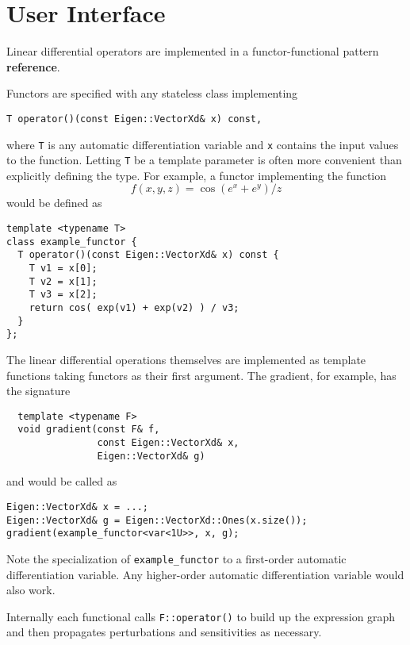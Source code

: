 \section{User Interface} \label{sec:user_interface}

Linear differential operators are implemented in a functor-functional
pattern \textbf{reference}.

Functors are specified with any stateless class implementing
%
\begin{verbatim}
T operator()(const Eigen::VectorXd& x) const,
\end{verbatim}
%
where \verb|T| is any automatic differentiation variable and \verb|x|
contains the input values to the function.  Letting \verb|T| be
a template parameter is often more convenient than explicitly
defining the type.  For example, a functor implementing the function
%
\begin{equation*}
f \! \left( x, y, z \right) = \cos \! \left( e^{x} + e^{y} \right) / z
\end{equation*}
%
would be defined as
%
\begin{verbatim}
template <typename T>
class example_functor {
  T operator()(const Eigen::VectorXd& x) const {
    T v1 = x[0];
    T v2 = x[1];
    T v3 = x[2];
    return cos( exp(v1) + exp(v2) ) / v3;  
  }
};
\end{verbatim}

The linear differential operations themselves are implemented as
template functions taking functors as their first argument.  The 
gradient, for example, has the signature
%
\begin{verbatim}
  template <typename F>
  void gradient(const F& f,
                const Eigen::VectorXd& x,
                Eigen::VectorXd& g)
\end{verbatim}
%
and would be called as
%
\begin{verbatim}
Eigen::VectorXd& x = ...;
Eigen::VectorXd& g = Eigen::VectorXd::Ones(x.size());
gradient(example_functor<var<1U>>, x, g);
\end{verbatim}
%
Note the specialization of \verb|example_functor| to a first-order
automatic differentiation variable.  Any higher-order automatic
differentiation variable would also work.

Internally each functional calls \verb|F::operator()| to build up
the expression graph and then propagates perturbations and
sensitivities as necessary.
